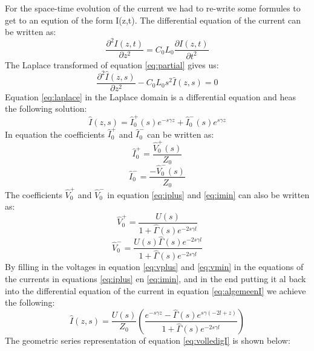 \documentclass[final]{scrreprt} %
\begin{document}
For the space-time evolution of the current we had to re-write some formules to get to an eqution of the form I(z,t). 
The differential equation of the current can be written as: 
\begin{equation} \label{eq:partial}
\frac{\partial^2I(z,t)}{\partial z^2}=C_{0}L_{0}\frac{\partial I(z,t)}{\partial t^2}
\end{equation}
The Laplace transformed of equation \ref{eq:partial} gives us:
\begin{equation} \label{eq:laplace}
\frac{\partial^2\hat{I}(z,s)}{\partial z^2} - C_{0}L_{0}s^2\hat{I}(z,s)=0
\end{equation}
Equation \ref{eq:laplace} in the Laplace domain is a differential equation and heas the following solution: 
\begin{equation} \label{eq:algemeen}
\hat{I}(z,s)=\hat{I}^{+}_{0}(s)e^{-s\gamma z} + \hat{I}^{-}_{0}(s)e^{s\gamma z}
\end{equation}
In equation \label{eq:algemeenI} the coefficients $\hat{I}^{+}_{0}$ and $\hat{I}^{-}_{0}$ can be written as:
\begin{equation} \label{eq:iplus}
\hat{I}^{+}_{0}= \frac{\hat{V}^{+}_{0}(s)}{Z_{0}}
\end{equation}
\begin{equation} \label{eq:imin}
\hat{I}^{-}_{0}= \frac{-\hat{V}^{-}_{0}(s)}{Z_{0}}
\end{equation}
The coefficients $\hat{V}^{+}_{0}$ and $\hat{V}^{-}_{0}$ in equation \ref{eq:iplus} and \ref{eq:imin} can also be written as:
\begin{equation} \label{eq:vplus}
\hat{V}^{+}_{0}= \frac{U(s)}{1 + \hat{\Gamma}(s)e^{-2s\gamma l}}
\end{equation}
\begin{equation} \label{eq:vmin}
\hat{V}^{-}_{0}= \frac{U(s)\hat{\Gamma}(s)e^{-2s\gamma l}}{1 + \hat{\Gamma}(s)e^{-2s\gamma l}}
\end{equation}
By filling in the voltages in equation \ref{eq:vplus} and \ref{eq:vmin} in the equations of the currents in equations \ref{eq:iplus} en \ref{eq:imin}, and in the end putting it al back into the differential equation of the current in equation \ref{eq:algemeenI} we achieve the following:
\begin{equation} \label{eq:volledigI}
\hat{I}(z,s)=\frac{U(s)}{Z_{0}}\left(\frac{e^{-s\gamma z} - \hat{\Gamma}(s)e^{s\gamma (-2l+z)}}{1 + \hat{\Gamma}(s)e^{-2s\gamma l}}\right)
\end{equation}
The geometric series representation of equation \ref{eq:volledigI} is shown below:
\end{document}
